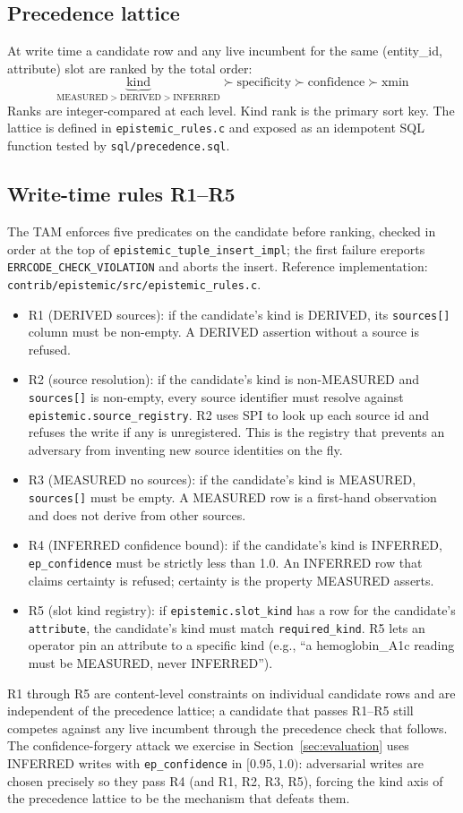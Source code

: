 \documentclass[sigconf, nonacm]{acmart}
\begin{document}
\subsection{Precedence lattice}
At write time a candidate row and any live incumbent for the same (entity\_id, attribute) slot are ranked by the total order:
\[
\underbrace{\text{kind}}_{\text{MEASURED}>\text{DERIVED}>\text{INFERRED}} \succ \text{specificity} \succ \text{confidence} \succ \text{xmin}
\]
Ranks are integer-compared at each level. Kind rank is the primary sort key. The lattice is defined in \texttt{epistemic\_rules.c} and exposed as an idempotent SQL function tested by \texttt{sql/precedence.sql}.

\subsection{Write-time rules R1--R5}
The TAM enforces five predicates on the candidate before ranking, checked in order at the top of \texttt{epistemic\_tuple\_insert\_impl}; the first failure ereports \texttt{ERRCODE\_CHECK\_VIOLATION} and aborts the insert. Reference implementation: \texttt{contrib/epistemic/src/epistemic\_rules.c}.
\begin{itemize}
\item R1 (DERIVED sources): if the candidate's kind is DERIVED, its \texttt{sources[]} column must be non-empty. A DERIVED assertion without a source is refused.
\item R2 (source resolution): if the candidate's kind is non-MEASURED and \texttt{sources[]} is non-empty, every source identifier must resolve against \texttt{epistemic.source\_registry}. R2 uses SPI to look up each source id and refuses the write if any is unregistered. This is the registry that prevents an adversary from inventing new source identities on the fly.
\item R3 (MEASURED no sources): if the candidate's kind is MEASURED, \texttt{sources[]} must be empty. A MEASURED row is a first-hand observation and does not derive from other sources.
\item R4 (INFERRED confidence bound): if the candidate's kind is INFERRED, \texttt{ep\_confidence} must be strictly less than 1.0. An INFERRED row that claims certainty is refused; certainty is the property MEASURED asserts.
\item R5 (slot kind registry): if \texttt{epistemic.slot\_kind} has a row for the candidate's \texttt{attribute}, the candidate's kind must match \texttt{required\_kind}. R5 lets an operator pin an attribute to a specific kind (e.g., ``a hemoglobin\_A1c reading must be MEASURED, never INFERRED'').
\end{itemize}
R1 through R5 are content-level constraints on individual candidate rows and are independent of the precedence lattice; a candidate that passes R1--R5 still competes against any live incumbent through the precedence check that follows. The confidence-forgery attack we exercise in Section~\ref{sec:evaluation} uses INFERRED writes with \texttt{ep\_confidence} in $[0.95, 1.0)$: adversarial writes are chosen precisely so they pass R4 (and R1, R2, R3, R5), forcing the kind axis of the precedence lattice to be the mechanism that defeats them.
\end{document}
